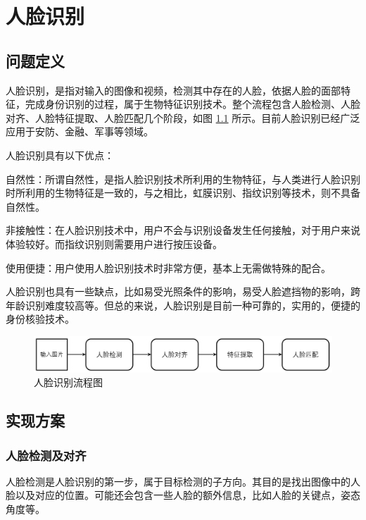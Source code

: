 %
%
%
\chapter{人脸识别}
\label{basic} %


\section{问题定义}
人脸识别，是指对输入的图像和视频，检测其中存在的人脸，依据人脸的面部特征，完成身份识别的过程，属于生物特征识别技术。整个流程包含人脸检测、人脸对齐、人脸特征提取、人脸匹配几个阶段，如图 \ref{fig:face_recog_flow_chart} 所示。目前人脸识别已经广泛应用于安防、金融、军事等领域。

人脸识别具有以下优点：

自然性：所谓自然性，是指人脸识别技术所利用的生物特征，与人类进行人脸识别时所利用的生物特征是一致的，与之相比，虹膜识别、指纹识别等技术，则不具备自然性。

非接触性：在人脸识别技术中，用户不会与识别设备发生任何接触，对于用户来说体验较好。而指纹识别则需要用户进行按压设备。

使用便捷：用户使用人脸识别技术时非常方便，基本上无需做特殊的配合。

人脸识别也具有一些缺点，比如易受光照条件的影响，易受人脸遮挡物的影响，跨年龄识别难度较高等。但总的来说，人脸识别是目前一种可靠的，实用的，便捷的身份核验技术。

\begin{figure}[ht]
\centering
\includegraphics[scale=0.5]{img/chapter_fr/face_recog_flow_chart.png}
\caption{人脸识别流程图}
\label{fig:face_recog_flow_chart}
\end{figure}

\section{实现方案}
\subsection{人脸检测及对齐}
人脸检测是人脸识别的第一步，属于目标检测的子方向。其目的是找出图像中的人脸以及对应的位置。可能还会包含一些人脸的额外信息，比如人脸的关键点，姿态角度等。


